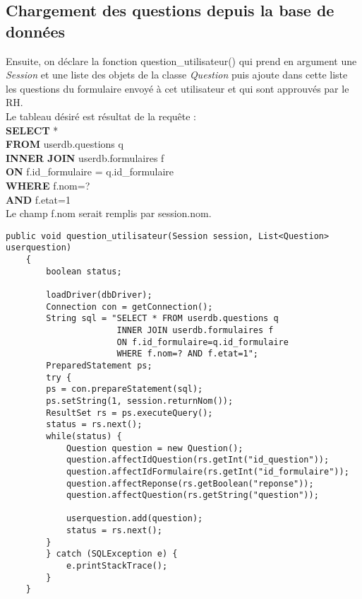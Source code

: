 \documentclass[12]{article}
\begin{document}
\subsection{Chargement des questions depuis la base de données}

Ensuite, on déclare la fonction question\_utilisateur() qui prend en argument une \textit{Session} et une liste des objets de la classe \textit{Question} puis ajoute dans cette liste les questions du formulaire envoyé à cet utilisateur et qui sont approuvés par le RH.\\


Le tableau désiré est résultat de la requête :\\
\textbf{SELECT} * \\
\textbf{FROM} userdb.questions q \\
\textbf{INNER JOIN} userdb.formulaires f \\
\textbf{ON} f.id\_formulaire = q.id\_formulaire\\
\textbf{WHERE} f.nom=? \\
\textbf{AND} f.etat=1\\

Le champ f.nom serait remplis par session.nom.



\begin{scriptsize}
\lstset{language=java}
\begin{lstlisting}
public void question_utilisateur(Session session, List<Question> userquestion)
	{
		boolean status;

		loadDriver(dbDriver);
		Connection con = getConnection();
		String sql = "SELECT * FROM userdb.questions q 
					  INNER JOIN userdb.formulaires f 
					  ON f.id_formulaire=q.id_formulaire 
					  WHERE f.nom=? AND f.etat=1";
		PreparedStatement ps;
		try {
		ps = con.prepareStatement(sql);
		ps.setString(1, session.returnNom());
		ResultSet rs = ps.executeQuery();
		status = rs.next();
		while(status) {
			Question question = new Question();
			question.affectIdQuestion(rs.getInt("id_question"));
			question.affectIdFormulaire(rs.getInt("id_formulaire"));
			question.affectReponse(rs.getBoolean("reponse"));
			question.affectQuestion(rs.getString("question"));

			userquestion.add(question);
			status = rs.next();
		}
		} catch (SQLException e) {
			e.printStackTrace();
		}
	}
\end{lstlisting}

\end{scriptsize}
\end{document}
